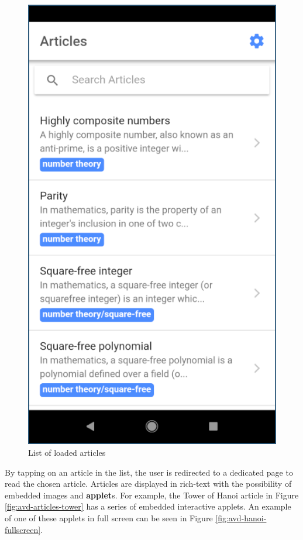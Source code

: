 \documentclass[12pt]{report}
\begin{document}
\begin{figure}
    \centering
    \includegraphics[scale=0.5]{images/avd-articles-loaded.png}
    \caption{List of loaded articles}
    \label{fig:avd-articles-loaded}
\end{figure}

By tapping on an article in the list, the user is redirected to a dedicated page
to read the chosen article. Articles are displayed in rich-text with the
possibility of embedded images and \textbf{applet}s. For example, the Tower of
Hanoi article in Figure \ref{fig:avd-articles-tower} has a series of embedded
interactive applets. An example of one of these applets in full screen can be
seen in Figure \ref{fig:avd-hanoi-fullscreen}.
\end{document}
